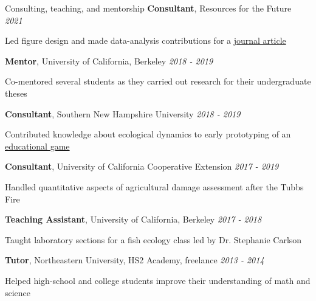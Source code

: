 \documentclass{resume} %
\begin{document}
\begin{rSection}{Consulting, teaching, and mentorship}
{\bf Consultant}{, Resources for the Future} \hfill {\em 2021}
\vspace{-7pt}
\begin{adjustwidth}{12pt}{}
{\small Led figure design and made data-analysis contributions for a \href{https://www.brookings.edu/articles/the-social-cost-of-carbon/}{journal article}}
\end{adjustwidth}
{\bf Mentor}{, University of California, Berkeley} \hfill {\em 2018 - 2019}
\vspace{-7pt}
\begin{adjustwidth}{12pt}{}
{\small Co-mentored several students as they carried out research for their undergraduate theses}
\end{adjustwidth}
{\bf Consultant}{, Southern New Hampshire University} \hfill {\em 2018 - 2019}
\vspace{-7pt}
\begin{adjustwidth}{12pt}{}
{\small Contributed knowledge about ecological dynamics to early prototyping of an \href{https://vimeo.com/417368718}{educational game}}
\end{adjustwidth}
{\bf Consultant}{, University of California Cooperative Extension} \hfill {\em 2017 - 2019}
\vspace{-7pt}
\begin{adjustwidth}{12pt}{}
{\small Handled quantitative aspects of agricultural damage assessment after the Tubbs Fire}
\end{adjustwidth}
{\bf Teaching Assistant}{, University of California, Berkeley} \hfill {\em 2017 - 2018}
\vspace{-7pt}
\begin{adjustwidth}{12pt}{}
{\small Taught laboratory sections for a fish ecology class led by Dr. Stephanie Carlson}
\end{adjustwidth}
{\bf Tutor}{, Northeastern University, HS2 Academy, freelance} \hfill {\em 2013 - 2014}
\vspace{-7pt}
\begin{adjustwidth}{12pt}{}
{\small Helped high-school and college students improve their understanding of math and science}
\end{adjustwidth}
\end{rSection}
\end{document}
